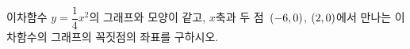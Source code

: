 \hspace*{2mm}\begin{minipage}[t]{\dimexpr\linewidth-2mm\relax}\vspace{0pt}
이차함수 $y=\dfrac{1}{4}x^2$의 그래프와 모양이 같고, $x$축과 두 점~$(-6{,}\mkern3mu 0)$, $(2{,}\mkern3mu 0)$에서 만나는 이차함수의 그래프의 꼭짓점의 좌표를 구하시오.\end{minipage}
